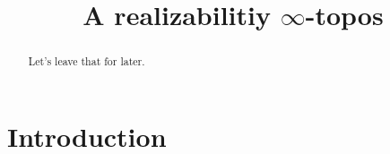 




\title{A realizabilitiy $\infty$-topos}
\author{}



\maketitle
\begin{abstract}
    Let's leave that for later.
\end{abstract}

% 

\section*{Introduction}







\nocite{hjp80,lurie2009higher}
\printbibliography

